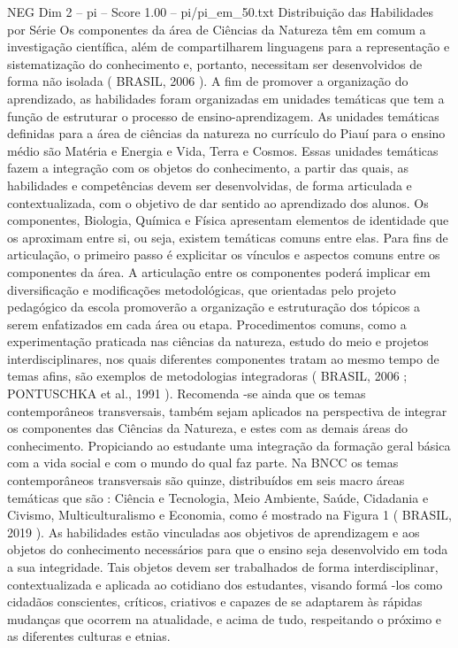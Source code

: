 \begin{textsample}{NEG Dim 2 – pi – Score 1.00 – pi/pi\_em\_50.txt}  \label{ex:f2_neg_192}
Distribuição das Habilidades por Série Os componentes da área de Ciências da Natureza têm em comum a investigação científica, além de compartilharem linguagens para a representação e sistematização do conhecimento e, portanto, necessitam ser desenvolvidos de forma não isolada ( BRASIL, 2006 ).
A fim de promover a organização do aprendizado, as habilidades foram organizadas em unidades temáticas que tem a função de estruturar o processo de ensino-aprendizagem.
As unidades temáticas definidas para a área de ciências da natureza no currículo do Piauí para o ensino médio são Matéria e Energia e Vida, Terra e Cosmos.
Essas unidades temáticas fazem a integração com os objetos do conhecimento, a partir das quais, as habilidades e competências devem ser desenvolvidas, de forma articulada e contextualizada, com o objetivo de dar sentido ao aprendizado dos alunos.
Os componentes, Biologia, Química e Física apresentam elementos de identidade que os aproximam entre si, ou seja, existem temáticas comuns entre elas.
Para fins de articulação, o primeiro passo é explicitar os vínculos e aspectos comuns entre os componentes da área.
A articulação entre os componentes poderá implicar em diversificação e modificações metodológicas, que orientadas pelo projeto pedagógico da escola promoverão a organização e estruturação dos tópicos a serem enfatizados em cada área ou etapa.
Procedimentos comuns, como a experimentação praticada nas ciências da natureza, estudo do meio e projetos interdisciplinares, nos quais diferentes componentes tratam ao mesmo tempo de temas afins, são exemplos de metodologias integradoras ( BRASIL, 2006 ; PONTUSCHKA et al., 1991 ).
Recomenda -se ainda que os temas contemporâneos transversais, também sejam aplicados na perspectiva de integrar os componentes das Ciências da Natureza, e estes com as demais áreas do conhecimento.
Propiciando ao estudante uma integração da formação geral básica com a vida social e com o mundo do qual faz parte.
Na BNCC os temas contemporâneos transversais são quinze, distribuídos em seis macro áreas temáticas que são : Ciência e Tecnologia, Meio Ambiente, Saúde, Cidadania e Civismo, Multiculturalismo e Economia, como é mostrado na Figura 1 ( BRASIL, 2019 ).
As habilidades estão vinculadas aos objetivos de aprendizagem e aos objetos do conhecimento necessários para que o ensino seja desenvolvido em toda a sua integridade.
Tais objetos devem ser trabalhados de forma interdisciplinar, contextualizada e aplicada ao cotidiano dos estudantes, visando formá -los como cidadãos conscientes, críticos, criativos e capazes de se adaptarem às rápidas mudanças que ocorrem na atualidade, e acima de tudo, respeitando o próximo e as diferentes culturas e etnias.

\end{textsample}
